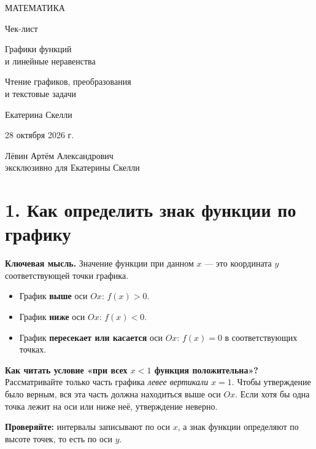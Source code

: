 \documentclass[a4paper,12pt]{article}
\newcommand{\keyidea}[1]{\textcolor{accent}{\textbf{#1}}}
\newcommand{\lessonsection}[1]{\section*{#1}}
\begin{document}
\begin{titlepage}
\thispagestyle{empty}
\centering
\vspace*{15mm}
{\color{accent}\large МАТЕМАТИКА\par}
\vspace{15mm}
{\fontsize{29}{34}\selectfont Чек-лист\par}
\vspace{15mm}
{\color{accent}\LARGE Графики функций\\и линейные неравенства\par}
\vspace{12mm}
{\large Чтение графиков, преобразования\\и текстовые задачи\par}
\vspace{20mm}
{\large Екатерина Скелли\par}
\vspace{10mm}
{28 октября 2026 г.\par}
\vfill
{\small Лёвин Артём Александрович\\эксклюзивно для Екатерины Скелли\par}
\vspace{10mm}
\end{titlepage}
\setcounter{page}{2}

\lessonsection{1. Как определить знак функции по графику}
\keyidea{Ключевая мысль.} Значение функции при данном $x$ --- это координата $y$ соответствующей точки графика.
\begin{itemize}
\item График \textbf{выше} оси $Ox$: $f(x)>0$.
\item График \textbf{ниже} оси $Ox$: $f(x)<0$.
\item График \textbf{пересекает или касается} оси $Ox$: $f(x)=0$ в соответствующих точках.
\end{itemize}
\keyidea{Как читать условие «при всех $x<1$ функция положительна»?}
Рассматривайте только часть графика \emph{левее вертикали $x=1$}. Чтобы утверждение было верным, вся эта часть должна находиться выше оси $Ox$. Если хотя бы одна точка лежит на оси или ниже неё, утверждение неверно.

\textbf{Проверяйте:} интервалы записывают по оси $x$, а знак функции определяют по высоте точек, то есть по оси $y$.
\end{document}
